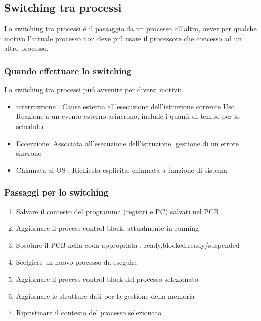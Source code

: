 \documentclass[11pt]{article}
\begin{document}
\subsection{Switching tra processi}
Lo switching tra processi é il passaggio da un processo all'altro, ovver per qualche motivo l'attuale processo non deve piú usare
il processore che concesso ad un altro processo.
\subsubsection{Quando effettuare lo switching}
Lo switching tra processi puó avvenire per diversi motivi:
\begin{itemize}
    \item interruzzione : Cause esterna all'esecuzione dell'istruzione corrente Uso Reazione a un evento esterno asincrono, include i quanti di tempo per lo scheduler
    \item Eccezzione: Associata all'esecuzione dell'istruzione, gestione di un errore sincrono
    \item Chiamata al OS : Richiesta esplicita, chiamata a funzione di sistema
\end{itemize}
\subsubsection{Passaggi per lo switching}
\begin{enumerate}
    \item Salvare il contesto del programma (registri e PC) salvati nel PCB
    \item Aggiornare il process control block, attualmente in running
    \item Spsotare il PCB nella coda appropriata : ready,blocked;ready/suspended
    \item Scelgiere un nuovo processo da eseguire
    \item Aggiornare il process control block del processo selezionato
    \item Aggiornare le strutture dati per la gestione della memoria
    \item Ripristinare il contesto del processo selezionato
\end{enumerate}
\end{document}
